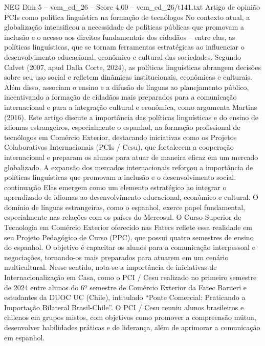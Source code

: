 \begin{textsample}{NEG Dim 5 – vem\_ed\_26 – Score 4.00 – vem\_ed\_26/t141.txt}  \label{ex:f5_neg_099}
Artigo de opinião PCIs como política linguística na formação de tecnólogos No contexto atual, a globalização intensificou a necessidade de políticas públicas que promovam a inclusão e o acesso aos direitos fundamentais dos cidadãos – entre elas, as políticas linguísticas, que se tornam ferramentas estratégicas ao influenciar o desenvolvimento educacional, econômico e cultural das sociedades.
Segundo Calvet (2007, apud Dalla Corte, 2024), as políticas linguísticas abrangem decisões sobre seu uso social e refletem dinâmicas institucionais, econômicas e culturais.
Além disso, associam o ensino e a difusão de línguas ao planejamento público, incentivando a formação de cidadãos mais preparados para a comunicação internacional e para a integração cultural e econômica, como argumenta Martins (2016).
Este artigo discute a importância das políticas linguísticas e do ensino de idiomas estrangeiros, especialmente o espanhol, na formação profissional de tecnólogos em Comércio Exterior, destacando iniciativas como os Projetos Colaborativos Internacionais (PCIs / Cesu), que fortalecem a cooperação internacional e preparam os alunos para atuar de maneira eficaz em um mercado globalizado.
A expansão dos mercados internacionais reforçou a importância de políticas linguísticas que promovam a inclusão e o desenvolvimento social. continuação Elas emergem como um elemento estratégico ao integrar o aprendizado de idiomas ao desenvolvimento educacional, econômico e cultural.
O domínio de línguas estrangeiras, como o espanhol, exerce papel fundamental, especialmente nas relações com os países do Mercosul.
O Curso Superior de Tecnologia em Comércio Exterior oferecido nas Fatecs reflete essa realidade em seu Projeto Pedagógico de Curso (PPC), que possui quatro semestres de ensino do espanhol.
O objetivo é capacitar os alunos para a comunicação interpessoal e negociações, tornando-os mais preparados para atuarem em um cenário multicultural.
Nesse sentido, nota-se a importância de iniciativas de Internacionalização em Casa, como o PCI / Cesu realizado no primeiro semestre de 2024 entre alunos do 6º semestre de Comércio Exterior da Fatec Barueri e estudantes da DUOC UC (Chile), intitulado “Ponte Comercial: Praticando a Importação Bilateral Brasil-Chile”.
O PCI / Cesu reuniu alunos brasileiros e chilenos em grupos mistos, com objetivos como promover a compreensão mútua, desenvolver habilidades práticas e de liderança, além de aprimorar a comunicação em espanhol.

\end{textsample}
